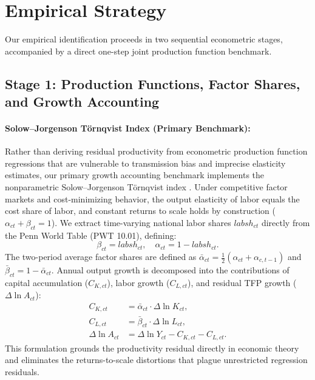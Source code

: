 \documentclass[11pt,a4paper]{article}
\begin{document}
\section{Empirical Strategy}
\label{sec:methods}

Our empirical identification proceeds in two sequential econometric stages, accompanied by a direct one-step joint production function benchmark.

\subsection{Stage 1: Production Functions, Factor Shares, and Growth Accounting}

\paragraph{Solow--Jorgenson Törnqvist Index (Primary Benchmark):}
Rather than deriving residual productivity from econometric production function regressions that are vulnerable to transmission bias and imprecise elasticity estimates, our primary growth accounting benchmark implements the nonparametric Solow--Jorgenson Törnqvist index \citep{jorgenson1967}. Under competitive factor markets and cost-minimizing behavior, the output elasticity of labor equals the cost share of labor, and constant returns to scale holds by construction ($\alpha_{ct} + \beta_{ct} = 1$). We extract time-varying national labor shares $labsh_{ct}$ directly from the Penn World Table (PWT 10.01), defining:
\begin{equation}
    \beta_{ct} = labsh_{ct}, \quad \alpha_{ct} = 1 - labsh_{ct}.
\end{equation}
The two-period average factor shares are defined as $\bar{\alpha}_{ct} = \frac{1}{2}(\alpha_{ct} + \alpha_{c,t-1})$ and $\bar{\beta}_{ct} = 1 - \bar{\alpha}_{ct}$. Annual output growth is decomposed into the contributions of capital accumulation ($C_{K,ct}$), labor growth ($C_{L,ct}$), and residual TFP growth ($\Delta \ln A_{ct}$):
\begin{align}
    C_{K,ct} &= \bar{\alpha}_{ct} \cdot \Delta \ln K_{ct}, \label{eq:ck_torn} \\
    C_{L,ct} &= \bar{\beta}_{ct} \cdot \Delta \ln L_{ct}, \label{eq:cl_torn} \\
    \Delta \ln A_{ct} &= \Delta \ln Y_{ct} - C_{K,ct} - C_{L,ct}. \label{eq:tfp_torn}
\end{align}
This formulation grounds the productivity residual directly in economic theory and eliminates the returns-to-scale distortions that plague unrestricted regression residuals.
\end{document}
